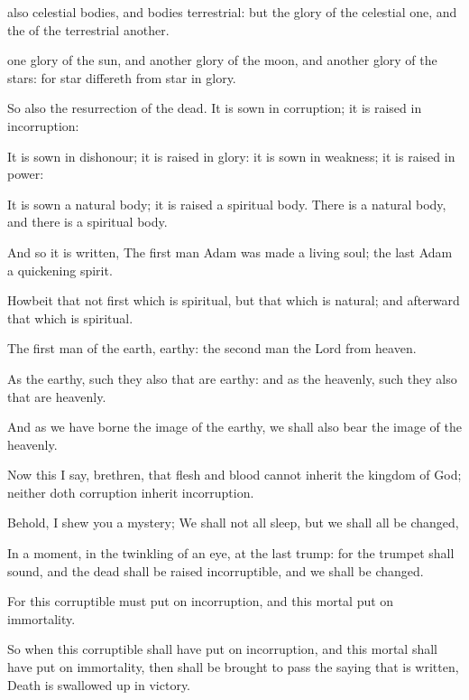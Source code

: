 {
also
celestial
bodies,
and
bodies
terrestrial:
but the
glory of the
celestial
{}
one,
and
the
{} of the
terrestrial
{}
another.

one
glory of the
sun,
and
another
glory of the
moon,
and
another
glory of the
stars:
for
{}
star differeth
from
{}
star
in
glory.

So
also
{} the
resurrection of the
dead. It is
sown
in
corruption; it is
raised
in
incorruption:

It is
sown
in
dishonour; it is
raised
in
glory: it is
sown
in
weakness; it is
raised
in
power:

It is
sown a
natural
body; it is
raised a
spiritual
body. There
is a
natural
body,
and there
is a
spiritual
body.

And
so it is
written, The
first
man
Adam was
made a
living
soul; the
last
Adam
{} a
quickening
spirit.

Howbeit
that
{}
not
first
which is
spiritual,
but that
which is
natural; and
afterward that
which is
spiritual.

The
first
man
{}
of the
earth,
earthy: the
second
man
{} the
Lord
from
heaven.

As
{} the
earthy,
such
{}
they
also that are
earthy:
and
as
{} the
heavenly,
such
{}
they
also that are
heavenly.

And
as we have
borne the
image of the
earthy, we
shall
also
bear the
image of the
heavenly.

Now
this I
say,
brethren,
that
flesh
and
blood
cannot
inherit the
kingdom of
God;
neither
doth
corruption
inherit
incorruption.

Behold, I
shew
you a
mystery; We
shall
not
all
sleep,
but we
shall
all be
changed,

In a
moment,
in the
twinkling of an
eye,
at the
last
trump:
for the trumpet shall
sound,
and the
dead shall be
raised
incorruptible,
and
we shall be
changed.

For
this
corruptible
must put
on
incorruption,
and
this
mortal
{} put
on
immortality.

So
when
this
corruptible shall have put
on
incorruption,
and
this
mortal shall have put
on
immortality,
then shall be brought to
pass the
saying
that is
written,
Death is swallowed
up
in
victory.

}
